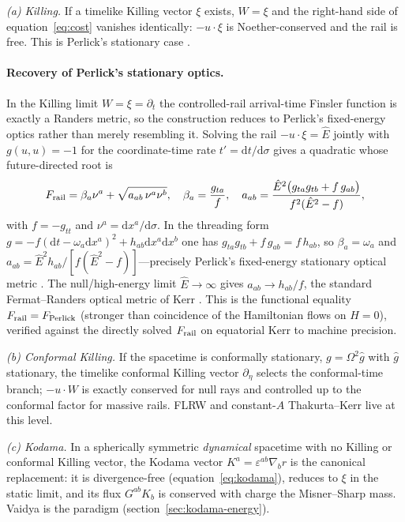 \documentclass[12pt]{iopart}
\newcommand{\Ehat}{\hat E}
\newcommand{\dd}{\mathrm{d}}
\begin{document}
\emph{(a) Killing.} If a timelike Killing vector $\xi$ exists, $W=\xi$ and the
right-hand side of equation~\eqref{eq:cost} vanishes identically: $-u\cdot\xi$ is
Noether-conserved and the rail is free. This is Perlick's stationary case
\cite{Perlick1991}.

\paragraph{Recovery of Perlick's stationary optics.} In the Killing limit
$W=\xi=\partial_t$ the controlled-rail arrival-time Finsler function is exactly a
Randers metric, so the construction reduces to Perlick's fixed-energy optics rather
than merely resembling it. Solving the rail $-u\cdot\xi=\Ehat$ jointly with
$g(u,u)=-1$ for the coordinate-time rate $t'=\dd t/\dd\sigma$ gives a quadratic whose
future-directed root is
\begin{equation}
F_{\rm rail}=\beta_a \nu^a+\sqrt{a_{ab}\,\nu^a \nu^b},\quad
\beta_a=\frac{g_{ta}}{f},\quad
a_{ab}=\frac{\Ehat^2\bigl(g_{ta}g_{tb}+f\,g_{ab}\bigr)}{f^2(\Ehat^2-f)},
\label{eq:perlick-randers}
\end{equation}
with $f=-g_{tt}$ and $\nu^a=\dd x^a/\dd\sigma$. In the threading form
$g=-f(\dd t-\omega_a\dd x^a)^2+h_{ab}\dd x^a\dd x^b$ one has
$g_{ta}g_{tb}+f\,g_{ab}=f\,h_{ab}$, so $\beta_a=\omega_a$ and
$a_{ab}=\Ehat^2 h_{ab}/[f(\Ehat^2-f)]$---precisely Perlick's fixed-energy stationary
optical metric \cite{Perlick1991}. The null/high-energy limit $\Ehat\to\infty$ gives
$a_{ab}\to h_{ab}/f$, the standard Fermat--Randers optical metric of Kerr
\cite{GibbonsWerner2008}. This is the functional equality $F_{\rm rail}=F_{\rm Perlick}$
(stronger than coincidence of the Hamiltonian flows on $H=0$), verified against the
directly solved $F_{\rm rail}$ on equatorial Kerr to machine precision.

\emph{(b) Conformal Killing.} If the spacetime is conformally stationary,
$g=\Omega^2\hat g$ with $\hat g$ stationary, the timelike conformal Killing
vector $\partial_\eta$ selects the conformal-time branch; $-u\cdot W$ is exactly
conserved for null rays and controlled up to the conformal factor for massive
rails. FLRW and constant-$A$ Thakurta--Kerr live at this level.

\emph{(c) Kodama.} In a spherically symmetric \emph{dynamical} spacetime with no
Killing or conformal Killing vector, the Kodama vector
$K^a=\varepsilon^{ab}\nabla_b r$ \cite{Kodama1980,Hayward1996} is the canonical
replacement: it is divergence-free (equation~\eqref{eq:kodama}), reduces to $\xi$ in
the static limit, and its flux $G^{ab}K_b$ is conserved with charge the
Misner--Sharp mass. Vaidya is the paradigm (section~\ref{sec:kodama-energy}).
\end{document}
